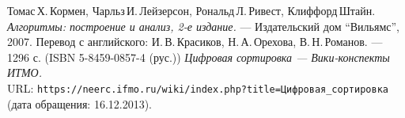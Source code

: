 \begin{thebibliography}{99}
Томас\,Х.\,Кормен, Чарльз\,И.\,Лейзерсон, Рональд\,Л.\,Ривест, Клиффорд\,Штайн.
{\itshape Алгоритмы: построение и анализ, 2-е издание.} --- Издательский дом \enquote{Вильямс}, 2007. Перевод с английского: И.\,В.\,Красиков, Н.\,А.\,Орехова, В.\,Н.\,Романов. --- 1296 с. (ISBN 5-8459-0857-4 (рус.))
{\itshape Цифровая сортировка — Вики-конспекты ИТМО.} \\URL: \texttt{https://neerc.ifmo.ru/wiki/index.php?title=Цифровая\_сортировка} (дата обращения: 16.12.2013).
\end{thebibliography}
\pagebreak

